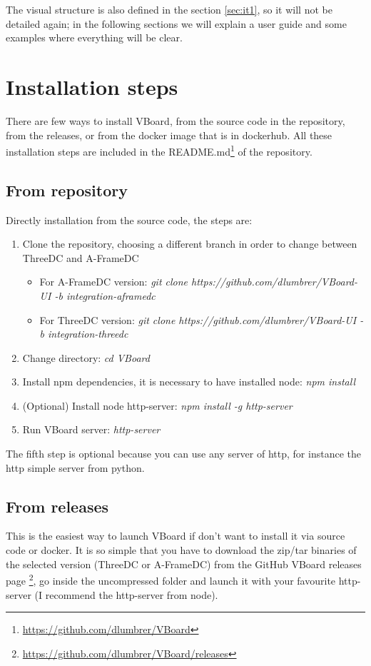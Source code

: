 \documentclass[a4paper, 12pt]{book}
\begin{document}
The visual structure is also defined in the section \ref{sec:it1}, so it will not be detailed again; in the following sections we will explain a user guide and some examples where everything will be clear.


\section{Installation steps}
There are few ways to install VBoard, from the source code in the repository, from the releases, or from the docker image that is in dockerhub. All these installation steps are included in the README.md\footnote{\url{https://github.com/dlumbrer/VBoard}} of the repository.

\subsection{From repository}
Directly installation from the source code, the steps are:
\begin{enumerate}
    \item Clone the repository, choosing a different branch in order to change between ThreeDC and A-FrameDC
    \begin{itemize}
        \item For A-FrameDC version: \textit{git clone https://github.com/dlumbrer/VBoard-UI -b integration-aframedc}
        \item For ThreeDC version: \textit{git clone https://github.com/dlumbrer/VBoard-UI -b integration-threedc}
    \end{itemize}
    \item Change directory: \textit{cd VBoard}
    \item Install npm dependencies, it is necessary to have installed node: \textit{npm install}
    \item (Optional) Install node http-server: \textit{npm install -g http-server}
    \item Run VBoard server: \textit{http-server}
\end{enumerate}

The fifth step is optional because you can use any server of http, for instance the http simple server from python.

\subsection{From releases}
This is the easiest way to launch VBoard if don't want to install it via source code or docker. It is so simple that you have to download the zip/tar binaries of the selected version (ThreeDC or A-FrameDC) from the GitHub VBoard releases page \footnote{\url{https://github.com/dlumbrer/VBoard/releases}}, go inside the uncompressed folder and launch it with your favourite http-server (I recommend the http-server from node).
\end{document}
